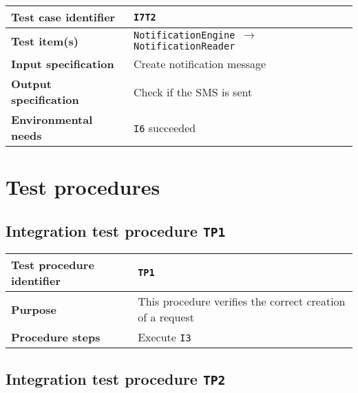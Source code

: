 \begin{table*}[!h]\centering\begin{tabularx}{.9\textwidth}{ >{\bfseries}l X }\toprule%
Test case identifier	&	\texttt{I7T2}	\\\midrule
Test item(s)		&	\texttt{NotificationEngine $\to$ NotificationReader}	\\\midrule
Input specification	&	Create notification message	\\\midrule
Output specification	&	Check if the SMS is sent	\\\midrule
Environmental needs	&	\texttt{I6} succeeded	\\
\bottomrule\end{tabularx}\end{table*}

















\section{Test procedures}







\subsection*{Integration test procedure \normalfont\texttt{TP1}}

\begin{table*}[!h]\centering\begin{tabularx}{.9\textwidth}{ >{\bfseries}l X }\toprule%
Test procedure identifier	&	\texttt{TP1}	\\\midrule
Purpose				&	This procedure verifies the correct creation of a request	\\\midrule
Procedure steps			&	Execute \texttt{I3}		\\
\bottomrule\end{tabularx}\end{table*}





\subsection*{Integration test procedure \normalfont\texttt{TP2}}

